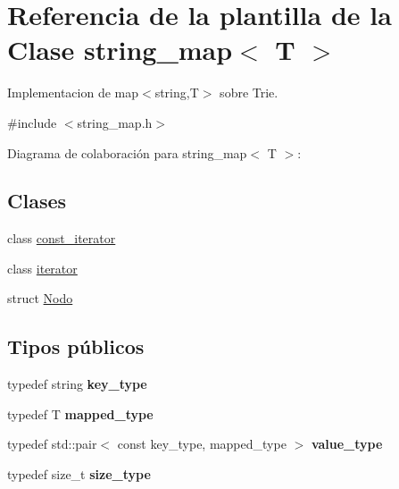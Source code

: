 \hypertarget{classstring__map}{}\section{Referencia de la plantilla de la Clase string\+\_\+map$<$ T $>$}
\label{classstring__map}


Implementacion de map$<$string,\+T$>$ sobre Trie.  




{\ttfamily \#include $<$string\+\_\+map.\+h$>$}



Diagrama de colaboración para string\+\_\+map$<$ T $>$\+:
\subsection*{Clases}
\begin{DoxyCompactItemize}
\item 
class \mbox{\hyperlink{classstring__map_1_1const__iterator}{const\+\_\+iterator}}
\item 
class \mbox{\hyperlink{classstring__map_1_1iterator}{iterator}}
\item 
struct \mbox{\hyperlink{structstring__map_1_1Nodo}{Nodo}}
\end{DoxyCompactItemize}
\subsection*{Tipos públicos}
\begin{DoxyCompactItemize}
\item 
\mbox{\label{classstring__map_ac6b29d74d0658db5938f53b66394d2ca}} 
typedef string {\bfseries key\+\_\+type}
\item 
\mbox{\label{classstring__map_a87309fe41124ea0f9f9fe22729e1fdf7}} 
typedef T {\bfseries mapped\+\_\+type}
\item 
\mbox{\label{classstring__map_aba7d0f8b84310cf46a990b404834074b}} 
typedef std\+::pair$<$ const key\+\_\+type, mapped\+\_\+type $>$ {\bfseries value\+\_\+type}
\item 
\mbox{\label{classstring__map_a91a355e52de423b8385b72caf553e3de}} 
typedef size\+\_\+t {\bfseries size\+\_\+type}
\end{DoxyCompactItemize}
